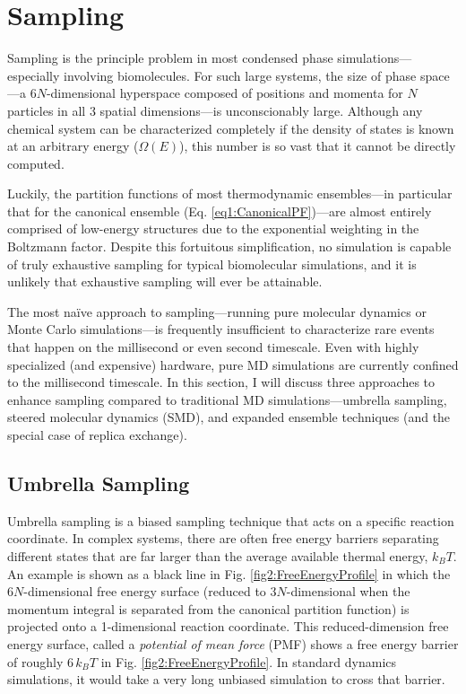 \section{Sampling}

Sampling is the principle problem in most condensed phase
simulations---especially involving biomolecules. For such large systems, the
size of phase space---a $6N$-dimensional hyperspace composed of positions and
momenta for $N$ particles in all 3 spatial dimensions---is unconscionably large.
Although any chemical system can be characterized completely if the density of
states is known at an arbitrary energy ($\Omega(E)$), this number is so vast
that it cannot be directly computed.

Luckily, the partition functions of most thermodynamic ensembles---in particular
that for the canonical ensemble (Eq. \ref{eq1:CanonicalPF})---are almost
entirely comprised of low-energy structures due to the exponential weighting in
the Boltzmann factor. Despite this fortuitous simplification, no simulation is
capable of truly exhaustive sampling for typical biomolecular simulations, and
it is unlikely that exhaustive sampling will ever be attainable. 

The most na\"ive approach to sampling---running pure molecular dynamics or Monte
Carlo simulations---is frequently insufficient to characterize rare events that
happen on the millisecond or even second timescale. Even with highly specialized
(and expensive) hardware, pure MD simulations are currently confined to the
millisecond timescale. \cite{Shaw2010} In this section, I will discuss three
approaches to enhance sampling compared to traditional MD simulations---umbrella
sampling, steered molecular dynamics (SMD), and expanded ensemble techniques
(and the special case of replica exchange).

\subsection{Umbrella Sampling}

Umbrella sampling is a biased sampling technique that acts on a specific
reaction coordinate. In complex systems, there are often free energy barriers
separating different states that are far larger than the average available
thermal energy, $k_BT$. An example is shown as a black line in Fig.
\ref{fig2:FreeEnergyProfile} in which the $6N$-dimensional free energy surface
(reduced to $3N$-dimensional when the momentum integral is separated from the
canonical partition function) is projected onto a 1-dimensional reaction
coordinate. This reduced-dimension free energy surface, called a \emph{potential
of mean force} (PMF) shows a free energy barrier of roughly $6\,k_BT$ in Fig.
\ref{fig2:FreeEnergyProfile}. In standard dynamics simulations, it would take a
very long unbiased simulation to cross that barrier.

